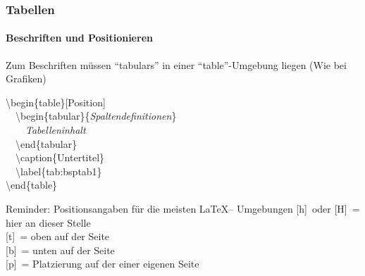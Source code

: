 \begin{frame}
\frametitle{Tabellen}
\framesubtitle{Beschriften und Positionieren}
Zum Beschriften müssen "`tabulars"' in einer "`table"'-Umgebung liegen (Wie bei Grafiken)\\ 

\medskip

\color{unibablueI}\begin{ttfamily}\textbackslash begin\color{black}\{table\}\color{nounibagreenI}[Position]\color{black}\\
~~\color{unibablueI}\textbackslash begin\color{black}\{tabular\}\{\textit{Spaltendefinitionen}\}\\
~~~~\textit{Tabelleninhalt}\\
~~\color{unibablueI}\textbackslash end\color{black}\{tabular\}\\
~~\color{nounibaredI}\textbackslash caption\color{black}\{Untertitel\}\\
~~\color{nounibaredI}\textbackslash label\color{black}\{tab:bsptab1\}\\
\color{unibablueI}\textbackslash end\color{black}\{table\}\\
\end{ttfamily}

\medskip

\begin{block}{Reminder: Positionsangaben f\"ur die meisten \LaTeX -- Umgebungen}
\color{nounibagreenI}[h]\color{black}~oder \color{nounibagreenI}[H]\color{black}~= hier an dieser Stelle\\
\color{nounibagreenI}[t]\color{black}~= oben auf der Seite\\ 
\color{nounibagreenI}[b]\color{black}~= unten auf der Seite\\ 
\color{nounibagreenI}[p]\color{black}~= Platzierung auf der einer eigenen Seite
\end{block}
\end{frame}




